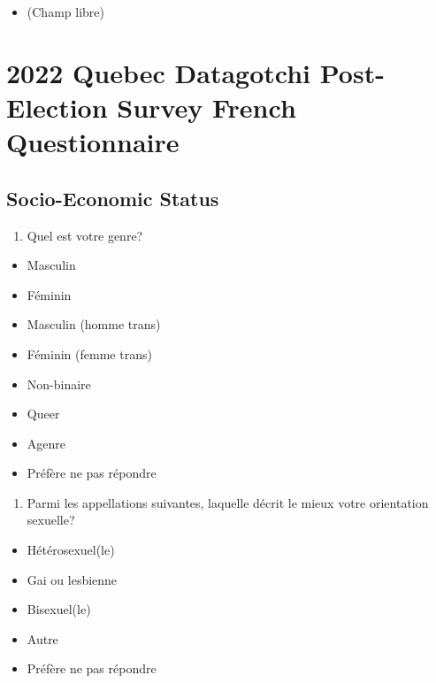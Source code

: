 \documentclass[
  letterpaper,
  DIV=11,
  numbers=noendperiod]{scrreprt}
\providecommand{\tightlist}{%
  \setlength{\itemsep}{0pt}\setlength{\parskip}{0pt}}\usepackage{longtable,booktabs,array}
\begin{document}
\begin{itemize}
\tightlist
\item
  (Champ libre)
\end{itemize}

\hypertarget{sec-appendix3}{%
\chapter{2022 Quebec Datagotchi Post-Election Survey French
Questionnaire}\label{sec-appendix3}}

\hypertarget{socio-economic-status}{%
\section{Socio-Economic Status}\label{socio-economic-status}}

\begin{enumerate}
\def\labelenumi{\arabic{enumi}.}
\tightlist
\item
  Quel est votre genre?
\end{enumerate}

\begin{itemize}
\tightlist
\item
  Masculin
\item
  Féminin
\item
  Masculin (homme trans)
\item
  Féminin (femme trans)
\item
  Non-binaire
\item
  Queer
\item
  Agenre
\item
  Préfère ne pas répondre
\end{itemize}

\begin{enumerate}
\def\labelenumi{\arabic{enumi}.}
\setcounter{enumi}{1}
\tightlist
\item
  Parmi les appellations suivantes, laquelle décrit le mieux votre
  orientation sexuelle?
\end{enumerate}

\begin{itemize}
\tightlist
\item
  Hétérosexuel(le)
\item
  Gai ou lesbienne
\item
  Bisexuel(le)
\item
  Autre
\item
  Préfère ne pas répondre
\end{itemize}
\end{document}
